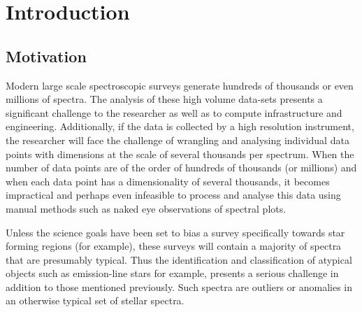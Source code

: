 \chapter{Introduction}
\section{Motivation}
Modern large scale spectroscopic surveys generate hundreds of thousands or even millions of spectra. The analysis of these high volume data-sets presents a significant challenge to the researcher as well as to compute infrastructure and engineering. Additionally, if the data is collected by a high resolution instrument, the researcher will face the challenge of wrangling and analysing individual data points with dimensions at the scale of several thousands per spectrum\cite{buder2021galah+}. When the number of data points are of the order of hundreds of thousands (or millions) and when each data point has a dimensionality of several thousands, it becomes impractical and perhaps even infeasible to process and analyse this data using manual methods such as naked eye observations of spectral plots. 

Unless the science goals have been set to bias a survey specifically towards star forming regions (for example)\cite{traven2015gaia}, these surveys will contain a majority of spectra that are presumably typical. Thus the identification and classification of atypical objects such as emission-line stars for example, presents a serious challenge in addition to those mentioned previously. Such spectra are outliers or anomalies in an otherwise typical set of stellar spectra.

